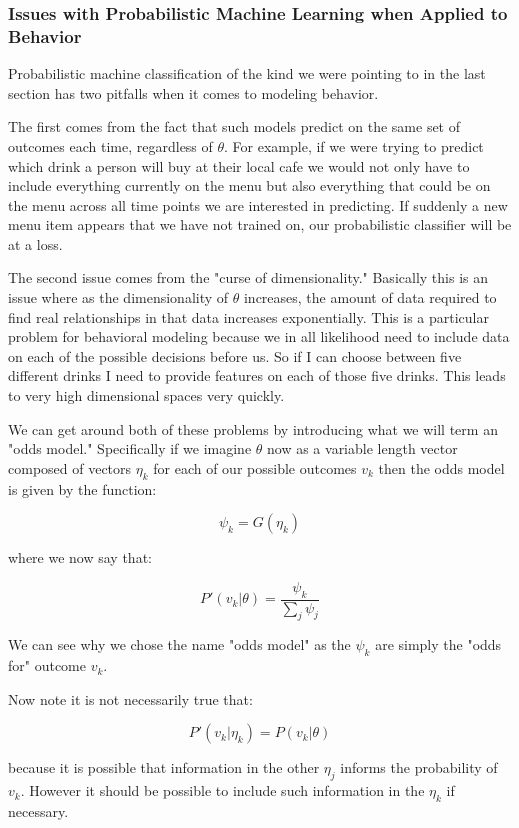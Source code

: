 \documentclass[11pt]{article}
\begin{document}
\subsubsection{Issues with Probabilistic Machine Learning when Applied to Behavior}

Probabilistic machine classification \citep{durr} of the kind we were pointing to in the last section has two pitfalls when it comes to modeling behavior. 

The first comes from the fact that such models predict on the same set of outcomes each time, regardless of $\theta$. For example, if we were trying to predict which drink a person will buy at their local cafe we would not only have to include everything currently on the menu but also everything that could be on the menu across all time points we are interested in predicting. If suddenly a new menu item appears that we have not trained on, our probabilistic classifier will be at a loss. 

The second issue comes from the "curse of dimensionality." Basically this is an issue where as the dimensionality of $\theta$ increases, the amount of data required to find real relationships in that data increases exponentially. This is a particular problem for behavioral modeling because we in all likelihood need to include data on each of the possible decisions before us. So if I can choose between five different drinks I need to provide features on each of those five drinks. This leads to very high dimensional spaces very quickly. \newline


We can get around both of these problems by introducing what we will term an "odds model." Specifically if we imagine $\theta$ now as a variable length vector composed of vectors $\eta_k$ for each of our possible outcomes $v_k$ then the odds model is given by the function:

$$\psi_k=G(\eta_k)$$

where we now say that:

$$P'(v_k|\theta) = \frac{\psi_k}{\sum_j \psi_j}$$

We can see why we chose the name "odds model" as the $\psi_k$ are simply the "odds for" outcome $v_k$. \newline

Now note it is not necessarily true that:

$$P'(v_k|\eta_k) = P(v_k|\theta)$$

because it is possible that information in the other $\eta_j$ informs the probability of $v_k$. However it should be possible to include such information in the $\eta_k$ if necessary. 
\end{document}
